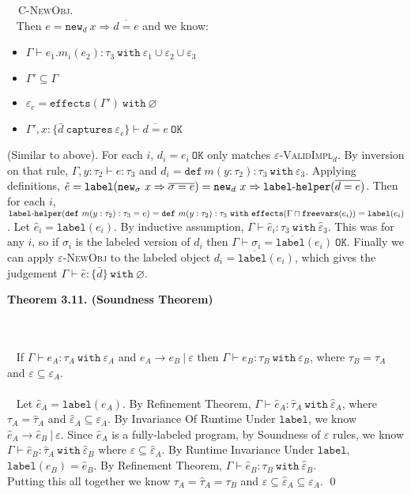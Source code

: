 \documentclass{llncs}
\newcommand{\keywadj}[1]{\mathtt{#1}}
\newcommand{\keyw}[1]{\keywadj{#1}~}
\newcommand{\hyphen}{\hbox{-}}
\newcommand{\thm}[3]{
	\begin{large}
		\bf{#1}
	\end{large} \\\\
	\fbox{Statement.} ~ #2
	\fbox{Proof.}~ #3 \qed
}
\newcommand{\proofcase}[2]{
	\begin{adjustwidth}{1.5em}{0pt}
		\fbox{Case.}~~#1. \\ ~#2
	\end{adjustwidth}
}
\newcommand{\type}[2]{
	#1~\keyw{with} #2
}
\newcommand{\newd}[0]{
	\keywadj{new}_d~x \Rightarrow \overline{d = e}
}
\newcommand{\newsig}[0]{
	\keywadj{new}_\sigma~x \Rightarrow \overline{\sigma = e}
}
\begin{document}
{\proofcase{\textsc{C-NewObj}}{
Then $e = \newd$ and we know:
\begin{itemize}
	\item $\Gamma \vdash e_1.m_i(e_2) : \type{\tau_3}{\varepsilon_1 \cup \varepsilon_2 \cup \varepsilon_3}$
	\item $\Gamma' \subseteq \Gamma$
	\item $\varepsilon_c = \keywadj{effects}(\Gamma')~\keyw{with} \varnothing$
	\item $\Gamma', x : \{ \bar d~\keyw{captures} \varepsilon_c \} \vdash \overline{d = e}~\keyw{OK}$
\end{itemize}
(Similar to above). For each $i$, $d_i = e_i~\keywadj{OK}$ only matches \textsc{$\varepsilon$-ValidImpl$_d$}. By inversion on that rule, $\Gamma, y : \tau_2 \vdash e: \tau_3$ and $d_i = \keyw{def} m(y : \tau_2) : \tau_3~\keyw{with} \varepsilon_3$. Applying definitions, $\hat e = \keywadj{label}(\newsig) = \keywadj{new}_d~x \Rightarrow \keywadj{label \hyphen helper}(\overline{d = e})$. Then for each $i$, $\keywadj{label \hyphen helper}(\keywadj{def}~m(y : \tau_2) : \tau_3 = e) = \keywadj{def}~m(y : \tau_2) : \tau_3~\keyw{with}  \keywadj{effects}(\Gamma \cap \keywadj{freevars}(e_i)) = \keywadj{label}(e_i)$. Let $\hat e_i = \keywadj{label}(e_i)$. By inductive assumption, $\Gamma \vdash \hat e_i : \tau_3~\keyw{with} \hat \varepsilon_3$. This was for any $i$, so if $\sigma_i$ is the labeled version of $d_i$ then $\Gamma \vdash \overline{ \sigma_i = \keywadj{label}(e_i) }~\keywadj{OK}$. Finally we can apply \textsc{$\varepsilon$-NewObj} to the labeled object $\overline{ d_i = \keywadj{label}(e_i) }$, which gives the judgement $\Gamma \vdash \hat e : \{ \bar d \}~\keyw{with} \varnothing$.
}
}

\thm{Theorem 3.11. (Soundness Theorem)}
{If $\Gamma \vdash e_A : \tau_A~\keyw{with} \varepsilon_A$ and $e_A \longrightarrow e_B~|~\varepsilon$ then $\Gamma \vdash e_B : \tau_B~\keyw{with} \varepsilon_B$, where $\tau_B = \tau_A$ and $\varepsilon \subseteq \varepsilon_A$.\\\\}
{Let $\hat e_A = \keywadj{label}(e_A)$. By Refinement Theorem, $\Gamma \vdash \hat e_A : \type{\hat \tau_A}{\hat \varepsilon_A}$, where $\tau_A = \hat \tau_A$ and $\hat \varepsilon_A \subseteq \varepsilon_A$. By Invariance Of Runtime Under $\keywadj{label}$, we know $\hat e_A \longrightarrow \hat e_B~|~\varepsilon$. Since $\hat e_A$ is a fully-labeled program, by Soundness of $\varepsilon$ rules, we know $\Gamma \vdash \hat e_B : \type{\hat \tau_A}{\hat \varepsilon_B}$ where $\varepsilon \subseteq \hat \varepsilon_A$. By Runtime Invariance Under $\keywadj{label}$, $\keywadj{label}(e_B) = \hat e_B$.  By Refinement Theorem, $\Gamma \vdash \hat e_B : \type{\tau_B}{\hat \varepsilon_B}$. \\

\noindent
Putting this all together we know $\tau_A = \hat \tau_A = \tau_B$ and $\varepsilon \subseteq \hat \varepsilon_A \subseteq \varepsilon_A$.
}
\end{document}
